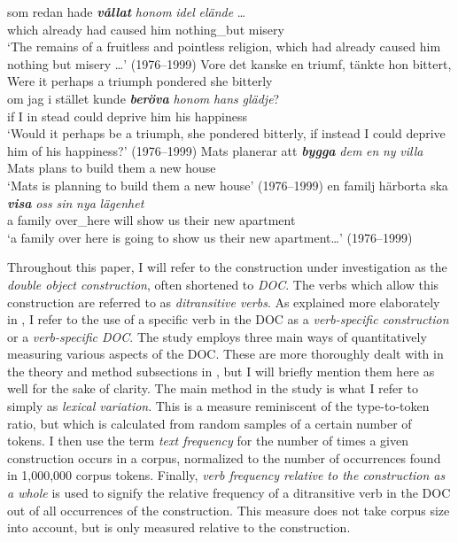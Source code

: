 \documentclass[output=paper]{langscibook}
\begin{document}
\gll som     redan      hade \textbf{\textit{vållat}} \textit{honom}  \textit{idel}        \textit{elände} …\\
  which already    had    caused    him    nothing\_but    misery\\
‘The remains of a fruitless and pointless religion, which had already caused him nothing but misery …’ (1976--1999)
\ex
\gll Vore   det   kanske    en   triumf,   tänkte       hon bittert,\\
  Were   it perhaps  a    triumph  pondered  she  bitterly  \\

\gll om  jag   i   stället  kunde \textbf{\textit{beröva}} \textit{honom}    \textit{hans}  \textit{glädje}?\\
  if    I      in    stead    could   deprive  him      his    happiness\\
‘Would it perhaps be a triumph, she pondered bitterly, if instead I could deprive him of his happiness?’ (1976--1999)
\ex
\gll Mats  planerar    att \textbf{\textit{bygga}} \textit{dem}  \textit{en}  \textit{ny}      \textit{villa}\\
  Mats    plans         to    build    them  a    new    house\\
\glt `Mats is planning to build them a new house’ (1976--1999)
\ex \label{ex:valdeson:7}
\gll en    familj    härborta  ska \textbf{\textit{visa}} \textit{oss}   \textit{sin}    \textit{nya}   \textit{lägenhet}\\
  a      family    over\_here  will    show  us   their  new  apartment\\
\glt `a family over here is going to show us their new apartment…’ (1976--1999)
\z


Throughout this paper, I will refer to the construction under investigation as the \textit{double object construction}, often shortened to \textit{DOC}. The verbs which allow this construction are referred to as \textit{ditransitive verbs}. As explained more elaborately in , I refer to the use of a specific verb in the DOC as a \textit{verb-specific construction} or a \textit{verb-specific DOC}. The study employs three main ways of quantitatively measuring various aspects of the DOC. These are more thoroughly dealt with in the theory and method subsections in , but I will briefly mention them here as well for the sake of clarity. The main method in the study is what I refer to simply as \textit{lexical variation}. This is a measure reminiscent of the type-to-token ratio, but which is calculated from random samples of a certain number of tokens. I then use the term \textit{text frequency} for the number of times a given construction occurs in a corpus, normalized to the number of occurrences found in 1,000,000 corpus tokens. Finally, \textit{verb frequency relative to the construction as a whole} is used to signify the relative frequency of a ditransitive verb in the DOC out of all occurrences of the construction. This measure does not take corpus size into account, but is only measured relative to the construction.
\end{document}
